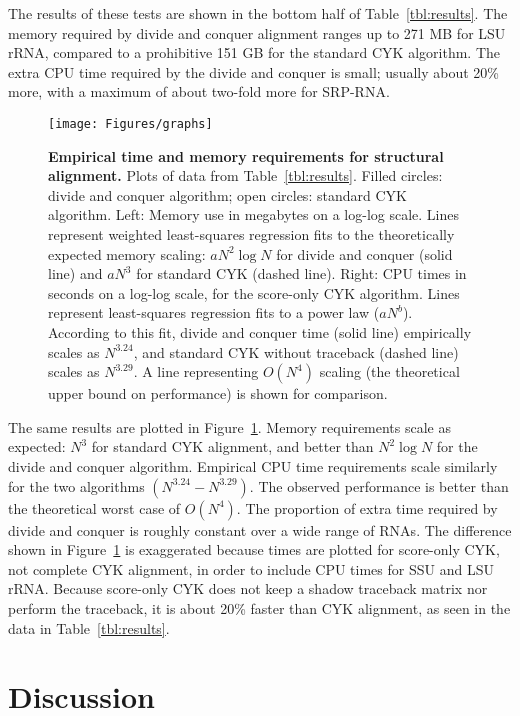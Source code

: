 \documentclass[11pt]{article}
\begin{document}
The results of these tests are shown in the bottom half of
Table~\ref{tbl:results}. The memory required by divide and conquer
alignment ranges up to 271 MB for LSU rRNA, compared to a prohibitive
151 GB for the standard CYK algorithm. The extra CPU time required by
the divide and conquer is small; usually about 20\% more, with a
maximum of about two-fold more for SRP-RNA.

\begin{figure}[ht]
\begin{center}
\texttt{[image: Figures/graphs]}
\end{center}
\caption{\textbf{Empirical time and memory requirements for structural
alignment.} Plots of data from Table~\ref{tbl:results}. Filled
circles: divide and conquer algorithm; open circles: standard CYK
algorithm. Left: Memory use in megabytes on a log-log scale. Lines
represent weighted least-squares regression fits to the theoretically
expected memory scaling: $aN^2 \log N$ for divide and conquer (solid
line) and $aN^3$ for standard CYK (dashed line). Right: CPU times in
seconds on a log-log scale, for the score-only CYK algorithm. Lines
represent least-squares regression fits to a power law ($aN^b$).
According to this fit, divide and conquer time (solid line)
empirically scales as $N^{3.24}$, and standard CYK without traceback
(dashed line) scales as $N^{3.29}$. A line representing $O(N^4)$
scaling (the theoretical upper bound on performance) is shown for
comparison.}
\label{fig:graphs}
\end{figure}

The same results are plotted in Figure~\ref{fig:graphs}. Memory
requirements scale as expected: $N^3$ for standard CYK alignment, and
better than $N^2 \log N$ for the divide and conquer algorithm.
Empirical CPU time requirements scale similarly for the two algorithms
$(N^{3.24}-N^{3.29})$. The observed performance is better than the
theoretical worst case of $O(N^4)$. The proportion of extra time
required by divide and conquer is roughly constant over a wide range
of RNAs. The difference shown in Figure~\ref{fig:graphs} is
exaggerated because times are plotted for score-only CYK, not complete
CYK alignment, in order to include CPU times for SSU and LSU
rRNA. Because score-only CYK does not keep a shadow traceback matrix
nor perform the traceback, it is about 20\% faster than CYK alignment,
as seen in the data in Table~\ref{tbl:results}.

\section{Discussion}
\end{document}
